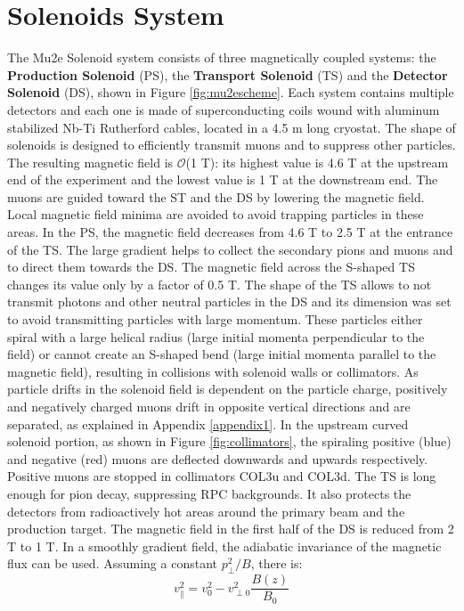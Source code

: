 \section{Solenoids System}
The Mu2e Solenoid system consists of three magnetically coupled systems: the \textbf{Production Solenoid} (PS), the \textbf{Transport Solenoid} (TS) and the \textbf{Detector Solenoid} (DS), shown in Figure \ref{fig:mu2escheme}. Each system contains multiple detectors and each one is made of superconducting coils wound with aluminum stabilized Nb-Ti Rutherford cables, located in a 4.5 m long cryostat. The shape of solenoids is designed to efficiently transmit muons and to suppress other particles. The resulting magnetic field is $\mathcal{O}$(1 T): its highest value is 4.6 T at the upstream end of the experiment and the lowest value is 1 T at the downstream end. 
The muons are guided toward the ST and the DS by lowering the magnetic field. Local magnetic field minima are avoided to avoid trapping particles in these areas. In the PS, the magnetic field decreases from 4.6 T to 2.5 T at the entrance of the TS. The large gradient helps to collect the secondary pions and muons and to direct them towards the DS. The magnetic field across the S-shaped TS changes its value only by a factor of 0.5 T. The shape of the TS allows to not transmit photons and other neutral particles in the DS and its dimension was set to avoid transmitting particles with large momentum. These particles either spiral with a large helical radius (large initial momenta perpendicular to the field) or cannot create an S-shaped bend (large initial momenta parallel to the magnetic field), resulting in collisions with solenoid walls or collimators. As particle drifts in the solenoid field is dependent on the particle charge, positively and negatively charged muons drift in opposite vertical directions and are separated, as explained in Appendix \ref{appendix1}. In the upstream curved solenoid portion, as shown in Figure \ref{fig:collimators}, the spiraling positive (blue) and negative (red) muons are deflected downwards and upwards respectively. Positive muons are stopped in collimators COL3u and COL3d. The TS is long enough for pion decay, suppressing RPC backgrounds. It also protects the detectors from radioactively hot areas around the primary beam and the production target. The magnetic field in the first half of the DS is reduced from 2 T to 1 T. In a smoothly gradient field, the adiabatic invariance of the magnetic flux can be used. Assuming a constant $p^2_\perp/B$, there is:
\begin{equation}
    v^2_{\parallel}=v^2_0-v^2_{\perp 0}\frac{B(z)}{B_0}
\end{equation}
